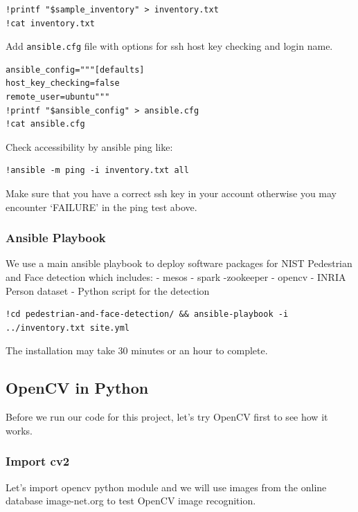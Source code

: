 \begin{lstlisting}
!printf "$sample_inventory" > inventory.txt
!cat inventory.txt
\end{lstlisting}

Add \texttt{ansible.cfg} file with options for ssh host key checking and
login name.

\begin{lstlisting}
ansible_config="""[defaults]
host_key_checking=false
remote_user=ubuntu"""
!printf "$ansible_config" > ansible.cfg
!cat ansible.cfg
\end{lstlisting}

Check accessibility by ansible ping like:

\begin{lstlisting}
!ansible -m ping -i inventory.txt all
\end{lstlisting}

Make sure that you have a correct ssh key in your account otherwise you
may encounter `FAILURE' in the ping test above.

\subsubsection{Ansible Playbook}\label{ansible-playbook}

We use a main ansible playbook to deploy software packages for NIST
Pedestrian and Face detection which includes: - mesos - spark -zookeeper
- opencv - INRIA Person dataset - Python script for the detection

\begin{lstlisting}
!cd pedestrian-and-face-detection/ && ansible-playbook -i ../inventory.txt site.yml
\end{lstlisting}

The installation may take 30 minutes or an hour to complete.

\subsection{OpenCV in Python}\label{opencv-in-python}

Before we run our code for this project, let's try OpenCV first to see
how it works.

\subsubsection{Import cv2}\label{import-cv2}

Let's import opencv python module and we will use images from the online
database image-net.org to test OpenCV image recognition.

